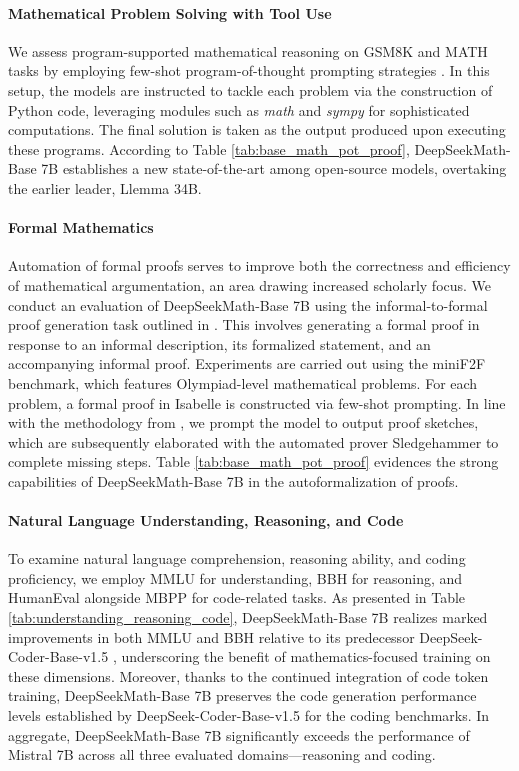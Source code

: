 \paragraph{Mathematical Problem Solving with Tool Use} We assess program-supported mathematical reasoning on GSM8K and MATH tasks by employing few-shot program-of-thought prompting strategies \citep{pot,pal}. In this setup, the models are instructed to tackle each problem via the construction of Python code, leveraging modules such as \textit{math} and \textit{sympy} for sophisticated computations. The final solution is taken as the output produced upon executing these programs. According to Table \ref{tab:base_math_pot_proof}, DeepSeekMath-Base 7B establishes a new state-of-the-art among open-source models, overtaking the earlier leader, Llemma 34B.

\paragraph{Formal Mathematics}

Automation of formal proofs serves to improve both the correctness and efficiency of mathematical argumentation, an area drawing increased scholarly focus. We conduct an evaluation of DeepSeekMath-Base 7B using the informal-to-formal proof generation task outlined in \citep{dsp_proof}. This involves generating a formal proof in response to an informal description, its formalized statement, and an accompanying informal proof. Experiments are carried out using the miniF2F \citep{minif2f} benchmark, which features Olympiad-level mathematical problems. For each problem, a formal proof in Isabelle is constructed via few-shot prompting. In line with the methodology from \cite{dsp_proof}, we prompt the model to output proof sketches, which are subsequently elaborated with the automated prover Sledgehammer \citep{sledgehammer} to complete missing steps. Table \ref{tab:base_math_pot_proof} evidences the strong capabilities of DeepSeekMath-Base 7B in the autoformalization of proofs.

\paragraph{Natural Language Understanding, Reasoning, and Code}

To examine natural language comprehension, reasoning ability, and coding proficiency, we employ MMLU \citep{mmlu} for understanding, BBH \citep{bbh} for reasoning, and HumanEval \citep{codex} alongside MBPP \citep{mbpp} for code-related tasks. As presented in Table \ref{tab:understanding_reasoning_code}, DeepSeekMath-Base 7B realizes marked improvements in both MMLU and BBH relative to its predecessor DeepSeek-Coder-Base-v1.5 \citep{deepseek-coder}, underscoring the benefit of mathematics-focused training on these dimensions. Moreover, thanks to the continued integration of code token training, DeepSeekMath-Base 7B preserves the code generation performance levels established by DeepSeek-Coder-Base-v1.5 for the coding benchmarks. In aggregate, DeepSeekMath-Base 7B significantly exceeds the performance of Mistral 7B \citep{mistral} across all three evaluated domains—reasoning and coding.

